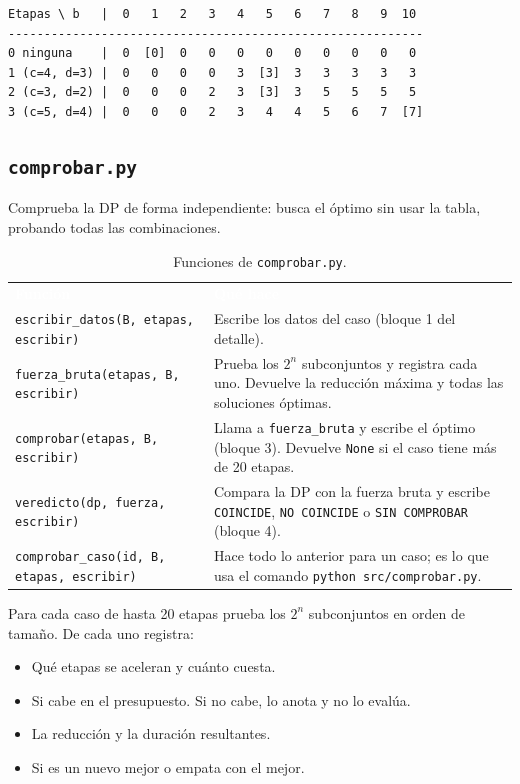 \documentclass[11pt,a4paper]{article}
\newcommand{\cod}[1]{\texttt{#1}}
\newcommand{\encabezado}{\rowcolor{fondo}}
\newcommand{\blanco}[1]{\textcolor{white}{\textbf{#1}}}
\begin{document}
\begin{lstlisting}
Etapas \ b   |  0   1   2   3   4   5   6   7   8   9  10
----------------------------------------------------------
0 ninguna    |  0  [0]  0   0   0   0   0   0   0   0   0
1 (c=4, d=3) |  0   0   0   0   3  [3]  3   3   3   3   3
2 (c=3, d=2) |  0   0   0   2   3  [3]  3   5   5   5   5
3 (c=5, d=4) |  0   0   0   2   3   4   4   5   6   7  [7]
\end{lstlisting}

\subsection{\cod{comprobar.py}}
\label{sub:comprobar}

Comprueba la DP de forma independiente: busca el óptimo sin usar la tabla, probando todas las combinaciones.

\begin{table}[H]
\centering\small
\renewcommand{\arraystretch}{1.2}
\begin{tabularx}{\textwidth}{@{}lX@{}}
\encabezado \blanco{Función} & \blanco{Qué hace} \\
\cod{escribir\_datos(B, etapas, escribir)} & Escribe los datos del caso (bloque 1 del detalle). \\
\cod{fuerza\_bruta(etapas, B, escribir)} & Prueba los $2^n$ subconjuntos y registra cada uno. Devuelve la reducción máxima y todas las soluciones óptimas. \\
\cod{comprobar(etapas, B, escribir)} & Llama a \cod{fuerza\_bruta} y escribe el óptimo (bloque 3). Devuelve \cod{None} si el caso tiene más de 20 etapas. \\
\cod{veredicto(dp, fuerza, escribir)} & Compara la DP con la fuerza bruta y escribe \cod{COINCIDE}, \cod{NO COINCIDE} o \cod{SIN COMPROBAR} (bloque 4). \\
\cod{comprobar\_caso(id, B, etapas, escribir)} & Hace todo lo anterior para un caso; es lo que usa el comando \cod{python src/comprobar.py}. \\
\bottomrule
\end{tabularx}
\caption{Funciones de \cod{comprobar.py}.}
\end{table}

Para cada caso de hasta 20 etapas prueba los $2^n$ subconjuntos en orden de tamaño. De cada uno registra:
\begin{itemize}
  \item Qué etapas se aceleran y cuánto cuesta.
  \item Si cabe en el presupuesto. Si no cabe, lo anota y no lo evalúa.
  \item La reducción y la duración resultantes.
  \item Si es un nuevo mejor o empata con el mejor.
\end{itemize}
\end{document}
